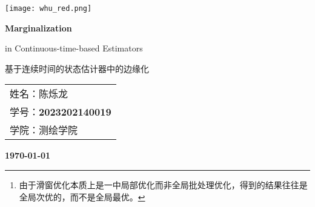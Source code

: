 \documentclass[12pt, onecolumn]{article}
\title{\normf{编程：观测值逐次更新的扩展卡尔曼滤波器}}
\author{\normf 姓名：陈烁龙\;\;\;学号：2023202140019\;\;\;学院：测绘学院}
\date{\normf{\today}}
\newcommand\normf{\fangsong}
\begin{document}
	\begin{titlepage}
	    \centering
	    \texttt{[image: whu\_red.png]}\par\vspace{1cm}
	    \vspace{4cm}
	    {\huge\kaishu\bfseries Marginalization\par in Continuous-time-based Estimators\par 基于连续时间的状态估计器中的边缘化 \par}
	    \vspace{3cm}
	    {\Large\kaishu 
	    \begin{center}\begin{tabular}{l}
	    姓名：陈烁龙\\
	    学号：\bfseries 2023202140019\\
	    学院：测绘学院
	    \end{tabular}\end{center}
	     \par}
	    
	
	    \vfill
	
	    {\large\kaishu\bfseries \today\par}
	\end{titlepage}
 		\thispagestyle{empty}
		\clearpage
		
		\tableofcontents
		\newpage
		\listoffigures
		
		\clearpage
		\setcounter{page}{1}
	
	
	\begin{abstract}
		\normf\bfseries
		近几年来，同时定位与地图构建(Simultaneous Localization And Mapping, SLAM)技术逐渐成熟，并被广泛应用于诸如自动驾驶、机器人领域中，来提供连续的位置服务和精确、一致的地图。出于实时性的要求，SLAM算法需要在优化精度和优化效率之间平衡。目前比较主流的方法是采用滑窗(Sliding Window)优化加边缘化(Marginalization)的策略，能够在保证实时性的同时，尽可能地减少局部优化\footnote{\normf 由于滑窗优化本质上是一中局部优化而非全局批处理优化，得到的结果往往是全局次优的，而不是全局最优。}带来的精度损失。
		
		目前绝大多的SLAM算法在进行优化的时候都针对的是离散位姿状态序列，是一种离散时间(Discrete Time，DT)估计方法。而相对应的连续时间(Continuous Time，CT)估计方法则使用时间域上的连续函数(比如B样条函数)表达位姿轨迹，优化的是连续函数的参量。相比于DT估计方法，CT估计方法在考虑了运动连续性的同时，能够更有利于异步、高频多源传感器的融合。CT方法目前在SLAM技术上应用的不是很多，主要是因为其优化量较大，效率较低。
		
		本文聚焦于基于CT的估计器中的边缘化问题，进行CT估计器中边缘化算法的探究、实现和测试。由于本人的研究方向是连续时间相关的SLAM技术，因此在本次考察报告中，在不偏离课程主题的情况下，对边缘化这一问题进行理论层面和实现层面的探究。
	\end{abstract}
	
\end{document}
